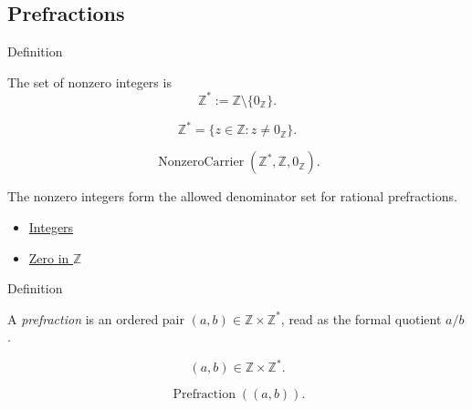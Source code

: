 \subsection*{Prefractions}

\begin{definitionbox}{Definition}
\begin{definition}
\label{def:nonzero-integers}
The set of nonzero integers is
\[
\mathbb{Z}^{\ast}:=\mathbb{Z}\setminus\{0_{\mathbb{Z}}\}.
\]
\end{definition}
\end{definitionbox}

\begin{remark*}
\[
\mathbb{Z}^{\ast}=\{z\in\mathbb{Z}:z\ne0_{\mathbb{Z}}\}.
\]
\end{remark*}

\begin{remark*}
\[
\operatorname{NonzeroCarrier}(\mathbb{Z}^{\ast},\mathbb{Z},0_{\mathbb{Z}}).
\]
\end{remark*}

\begin{remark*}[Interpretation]
The nonzero integers form the allowed denominator set for rational
prefractions.
\end{remark*}

\begin{dependencies}
\begin{itemize}
  \item \hyperref[def:integers]{Integers}
  \item \hyperref[def:zero-in-z]{Zero in $\mathbb{Z}$}
\end{itemize}
\end{dependencies}

\begin{definitionbox}{Definition}
\begin{definition}[Prefraction]
\label{def:prefraction}
A \emph{prefraction} is an ordered pair $(a,b)\in\mathbb{Z}\times\mathbb{Z}^{\ast}$,
read as the formal quotient $a/b$.
\end{definition}
\end{definitionbox}

\begin{remark*}
\[
(a,b)\in\mathbb{Z}\times\mathbb{Z}^{\ast}.
\]
\end{remark*}

\begin{remark*}
\[
\operatorname{Prefraction}((a,b)).
\]
\end{remark*}

